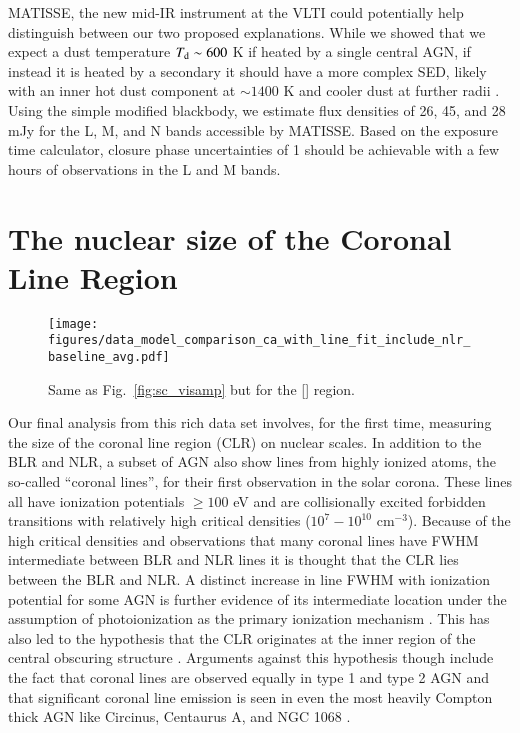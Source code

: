\documentclass[longauth,]{aa}
\newcommand{\caviii}{[\ion{Ca}{viii}]}
\begin{document}
MATISSE, the new mid-IR instrument at the VLTI could potentially help distinguish between our two proposed explanations. While we showed that we expect a dust temperature $T_{\rm d} \sim 600$ K if heated by a single central AGN, if instead it is heated by a secondary it should have a more complex SED, likely with an inner hot dust component at $\sim1400$ K and cooler dust at further radii \citep[e.g.][]{Kishimoto:2011aa}. Using the simple modified blackbody, we estimate flux densities of 26, 45, and 28 mJy for the L, M, and N bands accessible by MATISSE. Based on the exposure time calculator, closure phase uncertainties of 1\degree{} should be achievable with a few hours of observations in the L and M bands. 

\section{The nuclear size of the Coronal Line Region}\label{sec:clr}

\begin{figure*}
\centering
\texttt{[image: figures/data\_model\_comparison\_ca\_with\_line\_fit\_include\_nlr\_baseline\_avg.pdf]}
\caption{Same as Fig.~\ref{fig:sc_visamp} but for the \caviii{} region.}
\label{fig:sc_visamp_caviii}
\end{figure*}


Our final analysis from this rich data set involves, for the first time, measuring the size of the coronal line region (CLR) on nuclear scales. In addition to the BLR and NLR, a subset of AGN also show lines from highly ionized atoms, the so-called ``coronal lines'', for their first observation in the solar corona. These lines all have ionization potentials $\geq 100$ eV and are collisionally excited forbidden transitions with relatively high critical densities ($10^7 - 10^{10}$ cm$^{-3}$). Because of the high critical densities and observations that many coronal lines have FWHM intermediate between BLR and NLR lines \citep[e.g][]{Appenzeller:1991aa,Veilleux:1991aa,Rodriguez-Ardila:2006aa,Rodriguez-Ardila:2011aa,Lamperti:2017aa} it is thought that the CLR lies between the BLR and NLR. A distinct increase in line FWHM with ionization potential for some AGN is further evidence of its intermediate location \citep[e.g][]{Wilson:1979aa,Penston:1984aa,Thompson:1995aa,Rodriguez-Ardila:2002aa,Rodriguez-Ardila:2011aa} under the assumption of photoionization as the primary ionization mechanism \citep[e.g][]{Penston:1984aa,Ferguson:1997aa,Mazzalay:2010aa,Rodriguez-Ardila:2011aa}. This has also led to the hypothesis that the CLR originates at the inner region of the central obscuring structure \citep{Pier:1995aa,Ferguson:1997aa,Murayama:1998aa}. Arguments against this hypothesis though include the fact that coronal lines are observed equally in type 1 and type 2 AGN \citep[e.g.][]{Rodriguez-Ardila:2011aa} and that significant coronal line emission is seen in even the most heavily Compton thick AGN like Circinus, Centaurus A, and NGC 1068 \citep[e.g.][]{Moorwood:1996aa,Reunanen:2003aa,Rodriguez-Ardila:2006aa,Mazzalay:2010aa,Muller-Sanchez:2011aa}.
\end{document}
